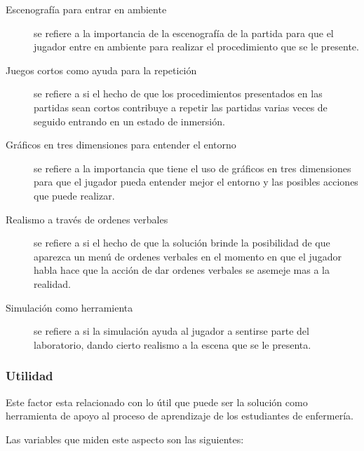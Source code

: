 \begin{description}

\item[Escenografía para entrar en ambiente] se refiere a la importancia de la
    escenografía de la partida para que el jugador entre en ambiente para
    realizar el procedimiento que se le presente.

\item[Juegos cortos como ayuda para la repetición] se refiere a si el hecho de
    que los procedimientos presentados en las partidas sean cortos contribuye a
    repetir las partidas varias veces de seguido entrando en un estado de
    inmersión.

\item[Gráficos en tres dimensiones para entender el entorno] se refiere a la
    importancia que tiene el uso de gráficos en tres dimensiones para que el
    jugador pueda entender mejor el entorno y las posibles acciones que puede
    realizar.

\item[Realismo a través de ordenes verbales] se refiere a si el hecho de que la
    solución brinde la posibilidad de que aparezca un menú de ordenes verbales
    en el momento en que el jugador habla hace que la acción de dar ordenes
    verbales se asemeje mas a la realidad.

\item[Simulación como herramienta] se refiere a si la simulación ayuda al
    jugador a sentirse parte del laboratorio, dando cierto realismo a la escena
    que se le presenta.

\end{description}

\subsubsection{Utilidad}
\label{sec:sub_utilidad}

Este factor esta relacionado con lo útil que puede ser la solución como
herramienta de apoyo al proceso de aprendizaje de los estudiantes de enfermería.

Las variables que miden este aspecto son las siguientes:


